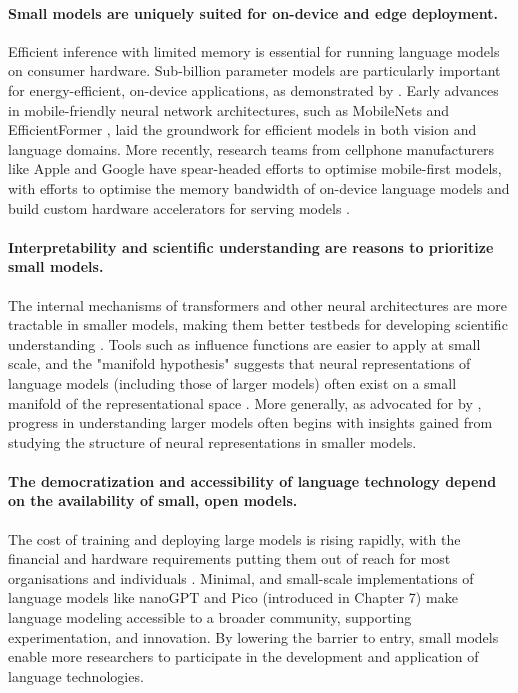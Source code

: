 \paragraph{Small models are uniquely suited for on-device and edge deployment.} Efficient inference with limited memory is essential for running language models on consumer hardware. Sub-billion parameter models are particularly important for energy-efficient, on-device applications, as demonstrated by \citet{liu2024mobilellm}. Early advances in mobile-friendly neural network architectures, such as MobileNets \citep{howard2017mobilenets} and EfficientFormer \citep{li2022efficientformer}, laid the groundwork for efficient models in both vision and language domains. More recently, research teams from cellphone manufacturers like Apple and Google have spear-headed efforts to optimise mobile-first models, with efforts to optimise the memory bandwidth of on-device language models \citep{alizadeh2024llm} and build custom hardware accelerators for serving models \citep{deepmind2023gemini}. %
 

\paragraph{Interpretability and scientific understanding are reasons to prioritize small models.} The internal mechanisms of transformers and other neural architectures are more tractable in smaller models, making them better testbeds for developing scientific understanding \citep{elhage2021mathematical, elhage2022toy, anthropic2023components}. Tools such as influence functions are easier to apply at small scale, and the "manifold hypothesis" suggests that neural representations of language models (including those of larger models) often exist on a small manifold of the representational space \citep{olah2014manifolds}. More generally, as advocated for by \citet{elhage2021mathematical}, progress in understanding larger models often begins with insights gained from studying the structure of neural representations in smaller models.

\paragraph{The democratization and accessibility of language technology depend on the availability of small, open models.} The cost of training and deploying large models is rising rapidly, with the financial and hardware requirements putting them out of reach for most organisations and individuals \citep{cottier2024rising, sharir2020cost}. Minimal, and small-scale implementations of language models like nanoGPT \citep{karpathy2023nanogpt} and Pico (introduced in Chapter 7) make language modeling accessible to a broader community, supporting experimentation, and innovation. By lowering the barrier to entry, small models enable more researchers to participate in the development and application of language technologies.


